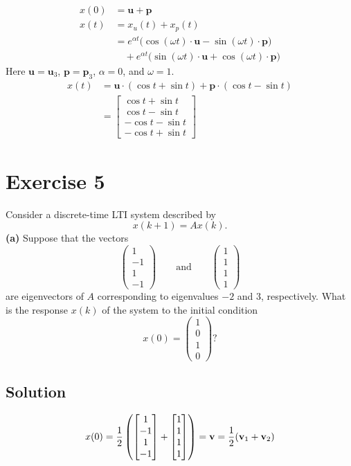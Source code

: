 \documentclass[12pt,a4paper]{article}
\begin{document}
\begin{align*}
	x(0) &= \mathbf{u} + \mathbf p \\
	x(t) &= x_u(t) + x_p(t) \\
	&= e^{\alpha t} \bigg( \cos (\omega t)\cdot \mathbf u - \sin(\omega t) \cdot \mathbf p \bigg) \\ &\quad{}+ e^{\alpha t} \bigg( \sin(\omega t)\cdot \mathbf u + \cos(\omega t) \cdot \mathbf p \bigg)
\end{align*}
Here $\mathbf u=\mathbf u_3$, $\mathbf p=\mathbf p_3$, $\alpha=0$, and $\omega=1$.
\begin{align*}
	x(t) &= \mathbf u \cdot (\cos t + \sin t) + \mathbf p \cdot (\cos t - \sin t) \\
	&= \begin{bmatrix}
		\cos t + \sin t \\
		\cos t - \sin t \\
		-\cos t - \sin t \\
		-\cos t + \sin t
	\end{bmatrix}
\end{align*}
\section*{Exercise 5}
Consider a discrete-time LTI system described by
\[x(k+1)=Ax(k).\]
\textbf{(a)} Suppose that the vectors
\[
\begin{pmatrix}1\\-1\\1\\-1\end{pmatrix}\qquad\text{and}\qquad
\begin{pmatrix}1\\1\\1\\1\end{pmatrix}
\]
are eigenvectors of $A$ corresponding to eigenvalues $-2$ and $3$, respectively. What is the response $x(k)$ of the system to the initial condition
\[x(0)=\begin{pmatrix}1\\0\\1\\0\end{pmatrix}?\]
\subsection*{Solution}

\[
x(0)  = {1\over 2} \left( \begin{bmatrix}
	1 \\ -1 \\ 1 \\ -1 
\end{bmatrix} + \begin{bmatrix}
	1 \\ 1\\1\\1
\end{bmatrix} \right)=\mathbf v= {1\over 2} (\mathbf v_1 + \mathbf v_2)
\]
\end{document}
